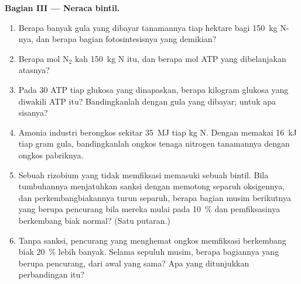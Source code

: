 \begin{problem}
\medskip
\noindent\textbf{Bagian III --- Neraca bintil.}
\begin{enumerate}[resume]
  \item Berapa banyak gula yang dibayar tanamannya tiap hektare bagi
        \qty{150}{kg} N-nya, dan berapa bagian fotosintesisnya
        yang demikian?
  \item Berapa mol N$_{2}$ kah \qty{150}{kg} N itu, dan berapa
        mol ATP yang dibelanjakan  atasnya?
  \item Pada $30$ ATP tiap glukosa yang dinapaskan, berapa kilogram glukosa
        yang diwakili ATP itu? Bandingkanlah dengan gula yang dibayar; untuk
        apa sisanya?
  \item Amonia industri berongkos sekitar \qty{35}{MJ} tiap kg N. Dengan
        memakai \qty{16}{kJ} tiap gram gula, bandingkanlah ongkos tenaga
        nitrogen tanamannya dengan ongkos pabriknya.
  \item Sebuah rizobium yang tidak memfiksasi memasuki sebuah bintil. Bila
        tumbuhannya menjatuhkan sanksi dengan memotong separuh oksigennya, dan
        perkembangbiakannya turun separuh, berapa bagian  musim
        berikutnya yang berupa pencurang bila mereka mulai pada \qty{10}{\%}
        dan pemfiksasinya berkembang biak normal? (Satu putaran.)
  \item Tanpa sanksi, pencurang yang menghemat ongkos memfiksasi
        berkembang biak \qty{20}{\%} lebih banyak. Selama sepuluh musim, berapa
        bagiannya yang berupa pencurang, dari awal yang sama? Apa yang
        ditunjukkan perbandingan itu?
\end{enumerate}


\end{problem}
